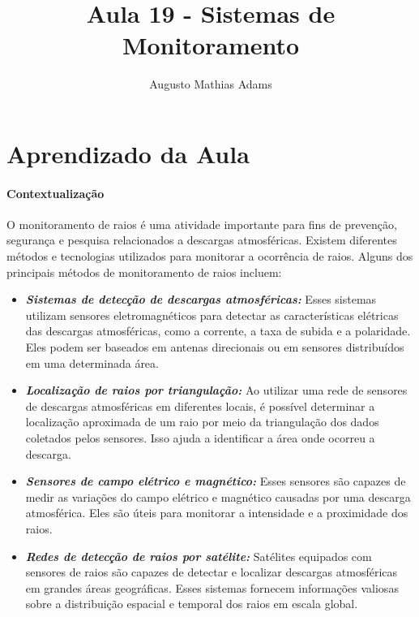 \documentclass[a4paper, 12pt, onecolumn,singlespacing]{article}
\title{Aula 19 - Sistemas de Monitoramento}
\author[1]{Augusto Mathias Adams}
\affil[1]{augusto.adams@ufpr.br}
\begin{document}
	
	\maketitle
	
	\section{Aprendizado da Aula}
	\paragraph{Contextualização}
	O monitoramento de raios é uma atividade importante para fins de prevenção, segurança e pesquisa relacionados a descargas atmosféricas. Existem diferentes métodos e tecnologias utilizados para monitorar a ocorrência de raios. Alguns dos principais métodos de monitoramento de raios incluem:
	
	\begin{itemize}
		\item \textbf{\textit{Sistemas de detecção de descargas atmosféricas:}} Esses sistemas utilizam sensores eletromagnéticos para detectar as características elétricas das descargas atmosféricas, como a corrente, a taxa de subida e a polaridade. Eles podem ser baseados em antenas direcionais ou em sensores distribuídos em uma determinada área.
		
		\item \textbf{\textit{Localização de raios por triangulação:}} Ao utilizar uma rede de sensores de descargas atmosféricas em diferentes locais, é possível determinar a localização aproximada de um raio por meio da triangulação dos dados coletados pelos sensores. Isso ajuda a identificar a área onde ocorreu a descarga.
		
		\item \textbf{\textit{Sensores de campo elétrico e magnético:}} Esses sensores são capazes de medir as variações do campo elétrico e magnético causadas por uma descarga atmosférica. Eles são úteis para monitorar a intensidade e a proximidade dos raios.
		
		\item \textbf{\textit{Redes de detecção de raios por satélite:}} Satélites equipados com sensores de raios são capazes de detectar e localizar descargas atmosféricas em grandes áreas geográficas. Esses sistemas fornecem informações valiosas sobre a distribuição espacial e temporal dos raios em escala global.
	\end{itemize}
	
\end{document}
